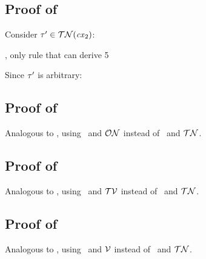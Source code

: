 \subsection*{Proof of }

\begin{derivation}
\end{derivation}
Consider $\tau'\in\mathcal{TN}(\mathit{cx}_2)$:
\begin{derivatioN}{3}
     {\premof{\Rcxtdec}, only rule that can derive 5}
\end{derivatioN}
Since $\tau'$ is arbitrary:
\begin{derivatioN}{8}
\end{derivatioN}



\subsection*{Proof of }

Analogous to , using \Rcxodec\ and $\mathcal{ON}$ instead
of \Rcxtdec\ and $\mathcal{TN}$.



\subsection*{Proof of }

Analogous to , using \Rcxtvdec\ and $\mathcal{TV}$ instead
of \Rcxtdec\ and $\mathcal{TN}$.



\subsection*{Proof of }

Analogous to , using \Rcxvdec\ and $\mathcal{V}$ instead
of \Rcxtdec\ and $\mathcal{TN}$.

